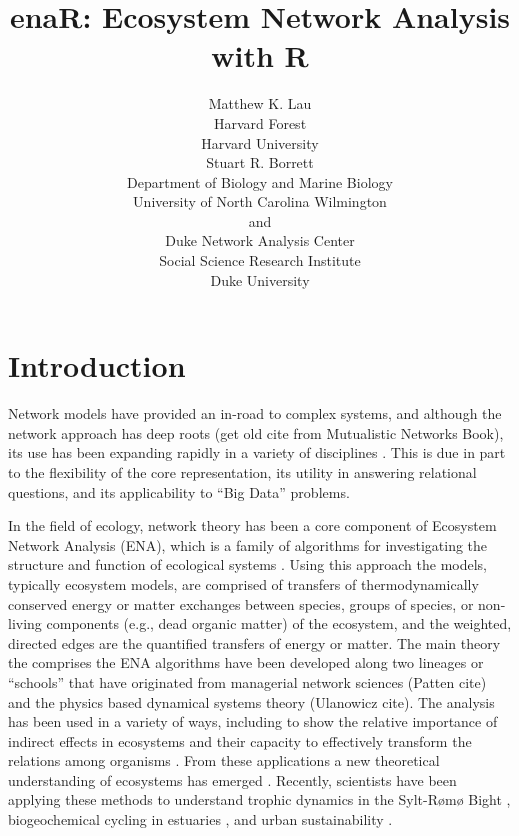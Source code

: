 \documentclass[article]{jss}
\author{Matthew K. Lau\\Harvard Forest\\Harvard University\\ \And
        Stuart R. Borrett\\Department of Biology and Marine Biology\\
        University of North Carolina Wilmington\\and\\Duke Network
        Analysis Center\\Social Science Research Institute\\Duke University}
\title{enaR: Ecosystem Network Analysis with R}
\begin{document}


\section[Introduction]{Introduction}
Network models have provided an in-road to complex systems, and
although the network approach has deep roots (get old cite from
Mutualistic Networks Book), its use has been expanding rapidly in a
variety of disciplines \citep{borrett14_rise, ings09}.  This is due in
part to the flexibility of the core representation, its utility in
answering relational questions, and its applicability to ``Big Data''
problems.


In the field of ecology, network theory has been a core component of
Ecosystem Network Analysis (ENA), which is a family of algorithms for
investigating the structure and function of ecological systems
\citep{borrett12_netecol,ulanowicz86,fath99_review}.  Using this
approach the models, typically ecosystem models, are comprised of
transfers of thermodynamically conserved energy or matter exchanges
between species, groups of species, or non-living components (e.g.,
dead organic matter) of the ecosystem, and the weighted, directed
edges are the quantified transfers of energy or matter. The main
theory the comprises the ENA algorithms have been developed along two
lineages or ``schools'' that have originated from managerial network
sciences (Patten cite) and the physics based dynamical systems theory
(Ulanowicz cite). The analysis has been used in a variety of ways,
including to show the relative importance of indirect effects in
ecosystems \citep{patten83, higashi89, salas11_did} and their capacity
to effectively transform the relations among organisms
\citep{ulanowicz90, patten91, fath98, bondavalli99}.  From these
applications a new theoretical understanding of ecosystems has emerged
\citep{higashi91, belgrano05, jorgensen07_newecology}.  Recently,
scientists have been applying these methods to understand trophic
dynamics in the Sylt-R{\o}m{\o} Bight
\citep{baird04_sylt,baird08_sylt}, biogeochemical cycling in estuaries
\cite{christian03, hines12}, and urban sustainability \citep{zhang10,
chen12}.
\end{document}
